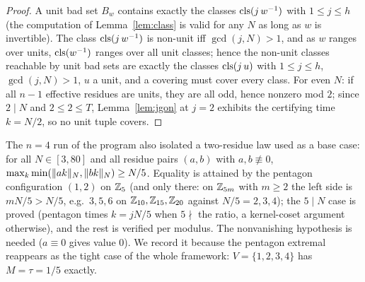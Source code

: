 \begin{proof}
A unit bad set $B_w$ contains exactly the classes $\operatorname{cls}(j\,w^{-1})$ with
$1\le j\le h$ (the computation of Lemma~\ref{lem:class} is valid for any
$N$ as long as $w$ is invertible). The class $\operatorname{cls}(j\,w^{-1})$ is
non-unit iff $\gcd(j,N)>1$, and as $w$ ranges over units, $\operatorname{cls}(w^{-1})$
ranges over all unit classes; hence the non-unit classes reachable by unit
bad sets are exactly the classes $\operatorname{cls}(j\,u)$ with $1\le j\le h$,
$\gcd(j,N)>1$, $u$ a unit, and a covering must cover every class. For
even $N$: if all $n-1$ effective residues are units, they are all odd,
hence nonzero mod $2$; since $2\mid N$ and $2\le 2\le T$,
Lemma~\ref{lem:jgon} at $j=2$ exhibits the certifying time $k=N/2$, so
no unit tuple covers.
\end{proof}

\begin{remark}\label{rem:tworunner}
The $n=4$ run of the program also isolated a two-residue law used as a
base case: for all $N\in[3,80]$ and all residue pairs $(a,b)$ with
$a,b\not\equiv 0$,
$\max_k\min(\lVert ak \rVert_{N},\lVert bk \rVert_{N})\ge N/5$. Equality is attained by the
pentagon configuration $(1,2)$ on $\mathbb{Z}_5$ (and only there: on $\mathbb{Z}_{5m}$
with $m\ge 2$ the left side is $mN/5>N/5$, e.g.\ $3,5,6$ on
$\mathbb{Z}_{10},\mathbb{Z}_{15},\mathbb{Z}_{20}$ against $N/5=2,3,4$); the $5\mid N$ case is
proved (pentagon times $k=jN/5$ when $5\nmid$ the ratio, a kernel-coset
argument otherwise), and the rest is verified per modulus. The
nonvanishing hypothesis is needed ($a\equiv 0$ gives value $0$). We
record it because the pentagon extremal reappears as the tight case of
the whole framework: $V=\{1,2,3,4\}$ has $M=\tau=1/5$ exactly.
\end{remark}
